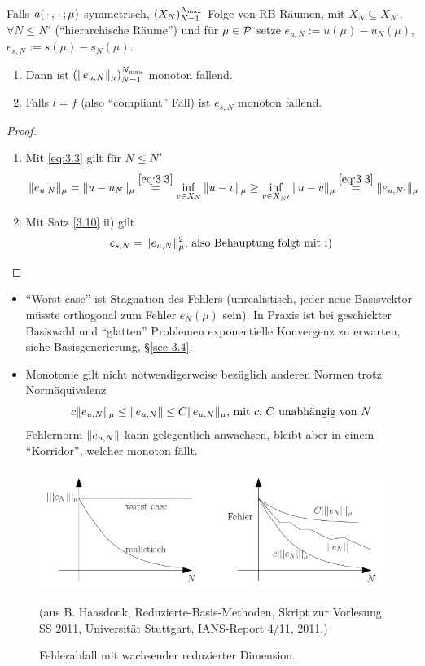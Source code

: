 \begin{kor} \label{3.11}
	Falls $a(\,\cdot\,,\,\cdot\,;\mu)$ symmetrisch, $\left(X_N\right)_{N=1}^{N_\text{max}}$ Folge von RB-Räumen, mit $X_N \subseteq X_{N'}$, $\forall N \leq N'$ (``hierarchische Räume'') und für $\mu \in \mathcal{P}$ setze $e_{u,N} := u(\mu)-u_N(\mu)$, $e_{s,N} := s(\mu)-s_N(\mu)$.
	\begin{enumerate}
		\item Dann ist $\left(\|e_{u,N}\|_\mu\right)_{N=1}^{N_\text{max}}$ monoton fallend.
		\item Falls $l=f$ (also ``compliant'' Fall) ist $e_{s,N}$ monoton fallend.
	\end{enumerate}

	\begin{proof} \beginwithlistbew
		\begin{enumerate}
			\item Mit \eqref{eq:3.3} gilt für $N \leq N'$
				\[
					\|e_{u,N}\|_\mu = \|u-u_N\|_\mu \stackrel{\eqref{eq:3.3}}{=} \inf_{v \in X_N} \|u-v\|_\mu \geq \inf_{v \in X_{N'}} \|u-v\|_\mu \stackrel{\eqref{eq:3.3}}{=} \|e_{u,N'}\|_\mu
				\]
			\item Mit Satz \ref{3.10} ii) gilt
				\[
					e_{s,N} = \|e_{u,N}\|_\mu^2 \text{, also Behauptung folgt mit i)}
				\]
		\end{enumerate}
	\end{proof}
\end{kor}

\begin{bem} \beginwithlistbem
	\begin{itemize}
		\item ``Worst-case'' ist Stagnation des Fehlers (unrealistisch, jeder neue Basisvektor müsste orthogonal zum Fehler $e_N(\mu)$ sein).
			In Praxis ist bei geschickter Basiswahl und ``glatten'' Problemen exponentielle Konvergenz zu erwarten, siehe Basisgenerierung, §\ref{sec-3.4}.
		\item Monotonie gilt nicht notwendigerweise bezüglich anderen Normen trotz Normäquivalenz
			\[
				c \|e_{u,N}\|_\mu \leq \|e_{u,N}\| \leq C \|e_{u,N}\|_\mu \text{, mit $c$, $C$ unabhängig von $N$}
			\]
			Fehlernorm $\|e_{u,N}\|$ kann gelegentlich anwachsen, bleibt aber in einem ``Korridor'', welcher monoton fällt.
	\end{itemize}

	\begin{figure}[H]
		\centering\small
		\includegraphics[width = 0.75 \textwidth]{Bilder/FehlerabfallEnergienorm.png}
		\caption{Fehlerabfall mit wachsender reduzierter Dimension.}{(aus B. Haasdonk, Reduzierte-Basis-Methoden, Skript zur Vorlesung SS 2011, Universität Stuttgart, IANS-Report 4/11, 2011.)}
		\label{fig:FehlerabfallEnergienorm}
	\end{figure}
\end{bem}

